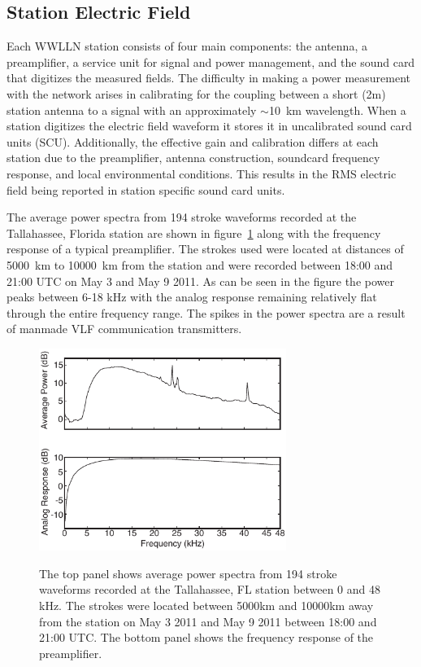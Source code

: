 \subsection{Station Electric Field}

Each WWLLN station consists of four main components: the antenna, a preamplifier, a service unit for signal and power management, and the sound card that digitizes the measured fields.
The difficulty in making a power measurement with the network arises in calibrating for the coupling between a short (2m) station antenna to a signal with an approximately $\sim$10~km wavelength.
When a station digitizes the electric field waveform it stores it in uncalibrated sound card units (SCU).
Additionally, the effective gain and calibration differs at each station due to the preamplifier, antenna construction, soundcard frequency response, and local environmental conditions.
This results in the RMS electric field being reported in station specific sound card units.

The average power spectra from 194 stroke waveforms recorded at the Tallahassee, Florida station are shown in figure~\ref{average_spectra} along with the frequency response of a typical preamplifier.
The strokes used were located at distances of 5000~km to 10000~km from the station and were recorded between 18:00 and 21:00 UTC on May 3 and May 9 2011.
As can be seen in the figure the power peaks between 6-18 kHz with the analog response remaining relatively flat through the entire frequency range.
The spikes in the power spectra are a result of manmade VLF communication transmitters.

 
 \begin{figure}[t]
 \noindent\includegraphics[width=19pc,angle=0]{energy/Figures/PPS_Spectra.pdf}\\
 \caption{The top panel shows average power spectra from 194 stroke waveforms recorded at the Tallahassee, FL station between 0 and 48 kHz. The strokes were located between 5000km and 10000km away from the  station on May 3 2011 and May 9 2011 between 18:00 and 21:00 UTC. The bottom panel shows the frequency response of the preamplifier.}
 \label{average_spectra}
 \end{figure}

